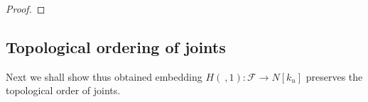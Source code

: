 \documentclass{amsart}
\theoremstyle{definition}
\numberwithin{figure}{section}
\numberwithin{equation}{section}
\begin{document}
\begin{proof}
%
\end{proof}

\subsection{Topological ordering of joints}
\label{topological order}
Next we shall show thus obtained embedding $H(\ , 1): \mathcal F \rightarrow N[k_u]$ preserves the topological order of joints.
\end{document}
